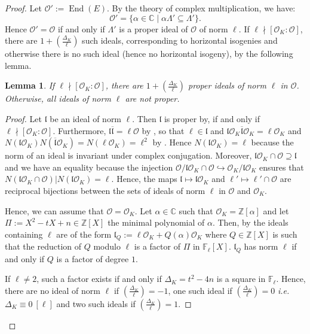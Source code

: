 \documentclass[a4paper,10pt]{report}
\theoremstyle{definition}
\theoremstyle{plain}
\newtheorem{Lemma}[Definition]{Lemma}
\theoremstyle{definition}
\newcommand{\ie}{\emph{i.e.}\ }
\newcommand{\Z}{\mathbb{Z}}
\newcommand{\C}{\mathbb{C}}
\newcommand{\F}{\mathbb{F}}
\newcommand{\mO}{\mathcal{O}}
\renewcommand{\(}{\left(}
\renewcommand{\)}{\right)}
\newcommand{\mf}[1]{\mathfrak{#1}}
\DeclareMathOperator{\End}{End}
\begin{document}
\begin{proof}
Let $\mO':=\End(E)$. By the theory of complex multiplication, we have:
\[\mO'=\{\alpha\in\C\mid \alpha \Lambda'\subseteq\Lambda'\}.\]
Hence $\mO'=\mO$ if and only if $\Lambda'$ is a proper ideal of $\mO$ of norm $\ell$.  If $\ell\nmid [\mO_K:\mO]$, there are $1+\(\frac{\Delta_K}{\ell}\)$ such ideals, corresponding to horizontal isogenies and otherwise there is no such ideal (hence no horizontal isogeny), by the following lemma. 

\begin{Lemma}\label{Lemma 1}
If $\ell\nmid [\mO_K:\mO]$, there are $1+\(\frac{\Delta_K}{\ell}\)$ proper ideals of norm $\ell$ in $\mO$. Otherwise,  all ideals of norm $\ell$ are not proper.
\end{Lemma}

\begin{proof}
Let $\mf{l}$ be an ideal of norm $\ell$.  Then $\mf{l}$ is proper by, \cite[Lemma 7.18.(ii)]{Cox} if and only if $\ell\nmid [\mO_K:\mO]$.  Furthermore, $\mf{l}\overline{\mf{l}}=\ell\mO$ by \cite[Lemma 7.14.(iii)]{Cox}, so that $\ell\in\mf{l}$ and $\mf{l}\mO_K\overline{\mf{l}}\mO_K=\ell\mO_K$ and $N(\mf{l}\mO_K)N(\overline{\mf{l}}\mO_K)=N(\ell\mO_K)=\ell^2$ by \cite[Lemma 7.14.(ii)]{Cox}. Hence $N(\mf{l}\mO_K)=\ell$ because the norm of an ideal is invariant under complex conjugation.  Moreover, $\mf{l}\mO_K\cap\mO\supseteq \mf{l}$ and we have an equality because the injection $\mO/\mf{l}\mO_K\cap\mO\hookrightarrow \mO_K/\mf{l}\mO_K$ ensures that $N(\mf{l}\mO_K\cap \mO)|N(\mf{l}\mO_K)=\ell$. Hence, the maps $\mf{l}\longmapsto\mf{l}\mO_K$ and $\mf{\ell'}\longmapsto\mf{\ell'}\cap\mO$ are reciprocal bijections between the sets of ideals of norm $\ell$ in $\mO$ and $\mO_K$.

Hence, we can assume that $\mO=\mO_K$. Let $\alpha\in\C$ such that $\mO_K=\Z[\alpha]$ and let $\Pi:=X^2-tX+n\in\Z[X]$ the minimal polynomial of $\alpha$. Then, by \cite[Proposition I.25]{Lang_ANT} the ideals containing $\ell$ are of the form $\mf{l}_Q:=\ell\mO_K+Q(\alpha)\mO_K$ where $Q\in\Z[X]$ is such that the reduction of $Q$ modulo $\ell$ is a factor of $\Pi$ in $\F_\ell[X]$.  $\mf{l}_Q$ has norm $\ell$ if and only if $Q$ is a factor of degree $1$. 

If $\ell\neq 2$, such a factor exists if and only if $\Delta_K=t^2-4n$ is a square in $\F_\ell$. Hence, there are no ideal of norm $\ell$ if $\(\frac{\Delta_K}{\ell}\)=-1$, one such ideal if $\(\frac{\Delta_K}{\ell}\)=0$ \ie $\Delta_K\equiv 0 \ [\ell]$ and two such ideals if $\(\frac{\Delta_K}{\ell}\)=1$. 


\end{proof}
\end{proof}
\end{document}
